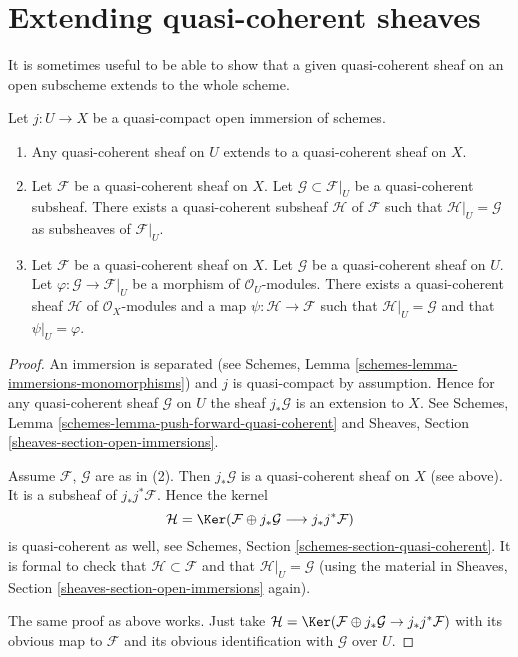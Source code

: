 \section{Extending quasi-coherent sheaves}
\label{section-extending-quasi-coherent-sheaves}

\noindent
It is sometimes useful to be able to show that a given quasi-coherent
sheaf on an open subscheme extends to the whole scheme.

\begin{lemma}
\label{lemma-extend-trivial}
Let $j : U \to X$ be a quasi-compact open immersion of schemes.
\begin{enumerate}
\item Any quasi-coherent sheaf on $U$ extends to a quasi-coherent
sheaf on $X$.
\item Let $\mathcal{F}$ be a quasi-coherent sheaf on $X$.
Let $\mathcal{G} \subset \mathcal{F}|_U$ be a quasi-coherent
subsheaf. There exists a quasi-coherent subsheaf $\mathcal{H}$ of
$\mathcal{F}$ such that $\mathcal{H}|_U = \mathcal{G}$
as subsheaves of $\mathcal{F}|_U$.
\item Let $\mathcal{F}$ be a quasi-coherent sheaf on $X$.
Let $\mathcal{G}$ be a quasi-coherent sheaf on $U$.
Let $\varphi : \mathcal{G} \to \mathcal{F}|_U$ be a morphism
of $\mathcal{O}_U$-modules. There exists a quasi-coherent sheaf $\mathcal{H}$
of $\mathcal{O}_X$-modules and a map $\psi : \mathcal{H} \to \mathcal{F}$
such that $\mathcal{H}|_U = \mathcal{G}$ and that
$\psi|_U = \varphi$.
\end{enumerate}
\end{lemma}

\begin{proof}
An immersion is separated
(see Schemes, Lemma \ref{schemes-lemma-immersions-monomorphisms})
and $j$ is quasi-compact by assumption.
Hence for any quasi-coherent sheaf $\mathcal{G}$ on $U$ the sheaf
$j_*\mathcal{G}$ is an extension to $X$. See
Schemes, Lemma \ref{schemes-lemma-push-forward-quasi-coherent} and
Sheaves, Section \ref{sheaves-section-open-immersions}.

\medskip\noindent
Assume $\mathcal{F}$, $\mathcal{G}$ are as in (2).
Then $j_*\mathcal{G}$ is a quasi-coherent sheaf on $X$ (see above).
It is a subsheaf of $j_*j^*\mathcal{F}$.
Hence the kernel
$$
\mathcal{H} =
\Ker(\mathcal{F} \oplus j_* \mathcal{G}
\longrightarrow j_*j^*\mathcal{F})
$$
is quasi-coherent as well, see
Schemes, Section \ref{schemes-section-quasi-coherent}.
It is formal to check that $\mathcal{H} \subset \mathcal{F}$ and that
$\mathcal{H}|_U = \mathcal{G}$ (using the material in
Sheaves, Section \ref{sheaves-section-open-immersions} again).

\medskip\noindent
The same proof as above works. Just take
$\mathcal{H} = \Ker(\mathcal{F} \oplus j_* \mathcal{G}
\to j_*j^*\mathcal{F})$ with its obvious map to $\mathcal{F}$
and its obvious identification with $\mathcal{G}$ over $U$.
\end{proof}

